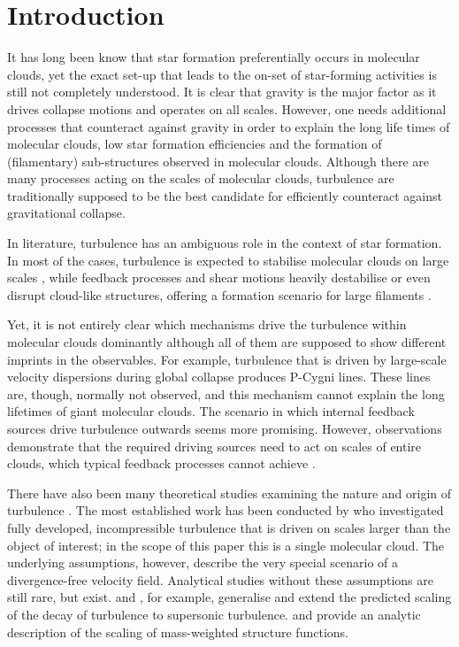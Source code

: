 \section{Introduction}\label{intro}

It has long been know that star formation preferentially occurs in molecular clouds, yet the exact set-up that leads to the on-set of star-forming activities is still not completely understood.
It is clear that gravity is the major factor as it drives collapse motions and operates on all scales.
However, one needs additional processes that counteract against gravity in order to explain the long life times of molecular clouds, low star formation efficiencies and the formation of (filamentary) sub-structures observed in molecular clouds. 
Although there are many processes acting on the scales of molecular clouds, turbulence are traditionally supposed to be the best candidate for efficiently counteract against gravitational collapse.

In literature, turbulence has an ambiguous role in the context of star formation. 
In most of the cases, turbulence is expected to stabilise molecular clouds on large scales \citep{Fleck1980,McKee1992,MacLow2003}, while feedback processes and shear motions heavily destabilise or even disrupt cloud-like structures, offering a formation scenario for large filaments \citep{Tan2013,Miyamoto2014}. 

Yet, it is not entirely clear which mechanisms drive the turbulence within molecular clouds dominantly although all of them are supposed to show different imprints in the observables. 
For example, turbulence that is driven by large-scale velocity dispersions during global collapse \citep{Ballesteros2011a,Ballesteros2011b,Hartmann2012} produces P-Cygni lines. 
These lines are, though, normally not observed, and this mechanism cannot explain the long lifetimes of giant molecular clouds. 
The scenario in which internal feedback sources drive turbulence outwards \citep{Dekel2013,Krumholz2014} seems more promising. 
However, observations demonstrate that the required driving sources need to act on scales of entire clouds, which typical feedback processes cannot achieve \citep{Brunt2009,Brunt2013,Heyer2004}.

There have also been many theoretical studies examining the nature and origin of turbulence \citep[and references within]{MacLow2004}. 
The most established work has been conducted by \citet{Kolmogorov1941} who investigated fully developed, incompressible turbulence that is driven on scales larger than the object of interest; in the scope of this paper this is a single molecular cloud. 
The underlying assumptions, however, describe the very special scenario of a divergence-free velocity field. 
Analytical studies without these assumptions are still rare, but exist. 
\citet{She1994} and \citet{Boldyrev2002}, for example, generalise and extend the predicted scaling of the decay of turbulence to supersonic turbulence.
\citet{Galtier2011} and \citet{Banerjee2013} provide an analytic description of the scaling of mass-weighted structure functions.

